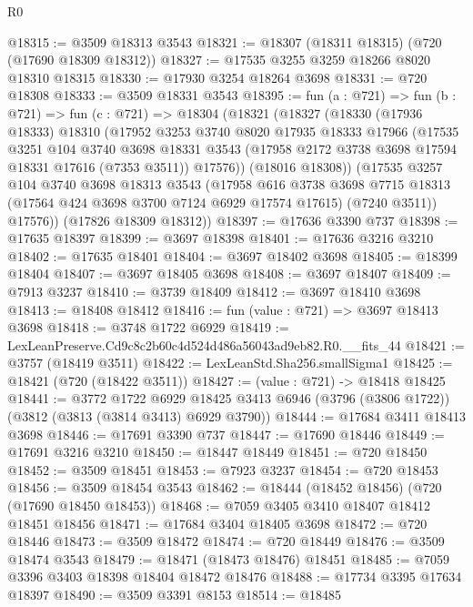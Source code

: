 \begin{lexlean}{R0}
\begin{coremodule}
@18315 := @3509 @18313 @3543
@18321 := @18307 (@18311 @18315) (@720 (@17690 @18309 @18312))
@18327 := @17535 @3255 @3259 @18266 @8020 @18310 @18315
@18330 := @17930 @3254 @18264 @3698
@18331 := @720 @18308
@18333 := @3509 @18331 @3543
@18395 := fun (a : @721) =>
  fun (b : @721) =>
  fun (c : @721) =>
  @18304
    (@18321
      (@18327
        (@18330
          (@17936 @18333)
          @18310
          (@17952
            @3253
            @3740
            @8020
            @17935
            @18333
            @17966
            (@17535
              @3251
              @104
              @3740
              @3698
              @18331
              @3543
              (@17958 @2172 @3738 @3698 @17594 @18331 @17616 (@7353 @3511))
              @17576))
          (@18016 @18308))
        (@17535
          @3257
          @104
          @3740
          @3698
          @18313
          @3543
          (@17958
            @616
            @3738
            @3698
            @7715
            @18313
            (@17564 @424 @3698 @3700 @7124 @6929 @17574 @17615)
            (@7240 @3511))
          @17576))
      (@17826 @18309 @18312))
@18397 := @17636 @3390 @737
@18398 := @17635 @18397
@18399 := @3697 @18398
@18401 := @17636 @3216 @3210
@18402 := @17635 @18401
@18404 := @3697 @18402 @3698
@18405 := @18399 @18404
@18407 := @3697 @18405 @3698
@18408 := @3697 @18407
@18409 := @7913 @3237
@18410 := @3739 @18409
@18412 := @3697 @18410 @3698
@18413 := @18408 @18412
@18416 := fun (value : @721) => @3697 @18413 @3698
@18418 := @3748 @1722 @6929
@18419 := LexLeanPreserve.Cd9c8c2b60c4d524d486a56043ad9eb82.R0.__fits_44
@18421 := @3757 (@18419 @3511)
@18422 := LexLeanStd.Sha256.smallSigma1
@18425 := @18421 (@720 (@18422 @3511))
@18427 := (value : @721) -> @18418 @18425
@18441 := @3772
    @1722
    @6929
    @18425
    @3413
    @6946
    (@3796 (@3806 @1722))
    (@3812 (@3813 (@3814 @3413) @6929 @3790))
@18444 := @17684 @3411 @18413 @3698
@18446 := @17691 @3390 @737
@18447 := @17690 @18446
@18449 := @17691 @3216 @3210
@18450 := @18447 @18449
@18451 := @720 @18450
@18452 := @3509 @18451
@18453 := @7923 @3237
@18454 := @720 @18453
@18456 := @3509 @18454 @3543
@18462 := @18444 (@18452 @18456) (@720 (@17690 @18450 @18453))
@18468 := @7059 @3405 @3410 @18407 @18412 @18451 @18456
@18471 := @17684 @3404 @18405 @3698
@18472 := @720 @18446
@18473 := @3509 @18472
@18474 := @720 @18449
@18476 := @3509 @18474 @3543
@18479 := @18471 (@18473 @18476) @18451
@18485 := @7059 @3396 @3403 @18398 @18404 @18472 @18476
@18488 := @17734 @3395 @17634 @18397
@18490 := @3509 @3391 @8153
@18514 := @18485

\end{coremodule}
\end{lexlean}
